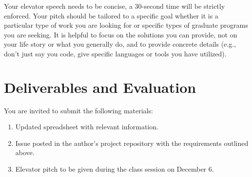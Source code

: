 \documentclass[11pt]{article}
\begin{document}
Your elevator speech needs to be concise, a 30-second time will be strictly enforced. Your pitch should be tailored to a specific goal whether it is a particular type of work you are looking for or specific types of graduate programs you are seeking. It is helpful to focus on the solutions you can provide, not on your life story or what you generally do, and to provide concrete details (e.g., don't just say you code, give specific languages or tools you have utilized).

\section*{Deliverables and Evaluation}

You are invited to submit the following materials:
\begin{enumerate}
	\item Updated spreadsheet with relevant information.
	\item Issue posted in the author's project repository with the requirements outlined above.
	\item Elevator pitch to be given during the class session on December 6.
\end{enumerate}
\end{document}
